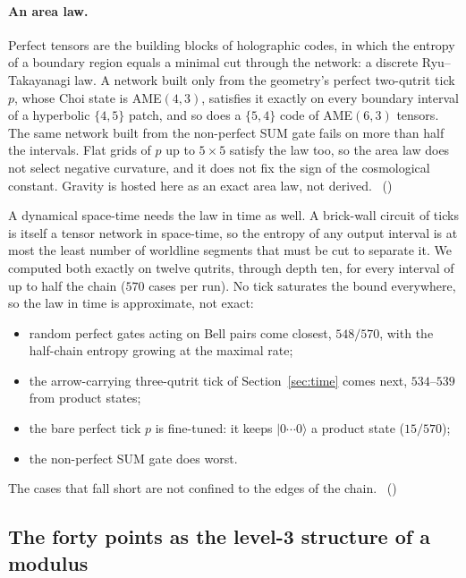 \paragraph{An area law.}
Perfect tensors are the building blocks of holographic codes, in which the entropy of a boundary region equals a
minimal cut through the network: a discrete Ryu--Takayanagi law. A network built only from the geometry's perfect
two-qutrit tick $p$, whose Choi state is AME$(4,3)$, satisfies it exactly on every boundary interval of a hyperbolic
$\{4,5\}$ patch, and so does a $\{5,4\}$ code of AME$(6,3)$ tensors. The same network built from the non-perfect SUM
gate fails on more than half the intervals. Flat grids of $p$ up to $5\times5$ satisfy the law too, so the area law
does not select negative curvature, and it does not fix the sign of the cosmological constant. Gravity is hosted here
as an exact area law, not derived. \tierC\ ()

A dynamical space-time needs the law in time as well. A brick-wall circuit of ticks is itself a tensor network in
space-time, so the entropy of any output interval is at most the least number of worldline segments that must be cut
to separate it. We computed both exactly on twelve qutrits, through depth ten, for every interval of up to half the
chain ($570$ cases per run). No tick saturates the bound everywhere, so the law in time is approximate, not exact:
\begin{itemize}
\item random perfect gates acting on Bell pairs come closest, $548/570$, with the half-chain entropy growing at the
  maximal rate;
\item the arrow-carrying three-qutrit tick of Section~\ref{sec:time} comes next, $534$--$539$ from product states;
\item the bare perfect tick $p$ is fine-tuned: it keeps $\lvert0\cdots0\rangle$ a product state ($15/570$);
\item the non-perfect SUM gate does worst.
\end{itemize}
The cases that fall short are not confined to the edges of the chain. \tierC\
()

\subsection{The forty points as the level-3 structure of a modulus}
\label{sec:siegel}

